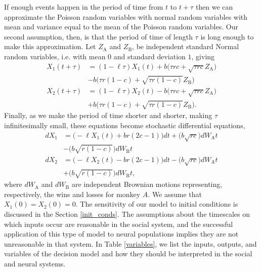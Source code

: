 \documentclass{pnastwo}
\begin{document}
\begin{article}
If enough events happen in the period of time from $t$ to $t+\tau$ then we can approximate the Poisson random variables with normal random variables with mean and variance equal to the mean of the Poisson random variables.  Our second assumption, then, is that the period of time of length $\tau$ is long enough to make this approximation. Let $Z_\text{A}$ and $Z_\text{B}$, be independent standard Normal random variables, i.e. with mean $0$ and standard deviation $1$, giving
\begin{align*}
X_1(t+\tau)&=(1-\ell\tau)X_1(t)+b\bigg(\tau rc+\sqrt{\tau rc}Z_{\text{A}}\bigg)\\&-b\bigg(\tau r(1-c)+\sqrt{\tau r(1-c)}Z_{\text{B}}\bigg)
\\X_2(t+\tau)&=(1-\ell\tau)X_2(t)-b\bigg(\tau rc+\sqrt{\tau rc}Z_{\text{A}}\bigg)\\&+b\bigg(\tau r(1-c)+\sqrt{\tau r(1-c)}Z_{\text{B}}\bigg).
\end{align*}
Finally, as we make the period of time shorter and shorter, making $\tau$ infinitesimally small, these equations become stochastic differential equations,
\begin{equation*}
\begin{array}{ll}
dX_1&=\bigg(-\ell X_1(t)+br(2c-1)\bigg)dt+\bigg(b\sqrt{rc}\bigg)dW_\text{A}t\\&-\bigg(b\sqrt{r(1-c)}\bigg)dW_\text{B}t
\\dX_2&=\bigg(-\ell X_2(t)-br(2c-1)\bigg)dt-\bigg(b\sqrt{rc}\bigg)dW_\text{A}t\\&+\bigg(b\sqrt{r(1-c)}\bigg)dW_\text{B}t,
\end{array}
\end{equation*}
where $dW_{\text{A}}$ and $dW_{\text{B}}$ are independent Brownian motions representing, respectively, the wins and losses for monkey $A$.  We assume that $X_1(0)=X_2(0)=0$. The sensitivity of our model to initial conditions is discussed in the Section \ref{init_conds}. The assumptions about the timescales on which inputs occur are reasonable in the social system, and the successful application of this type of model to neural populations implies they are not unreasonable in that system.  In Table \ref{variables}, we list the inputs, outputs, and variables of the decision model and how they should be interpreted in the social and neural systems.



\end{article}
\end{document}
